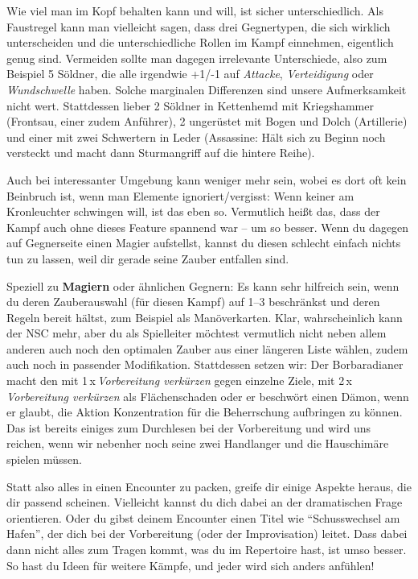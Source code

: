 Wie viel man im Kopf behalten kann und will, ist sicher unterschiedlich.
Als Faustregel kann man vielleicht sagen, dass drei Gegnertypen, die sich wirklich unterscheiden und die unterschiedliche Rollen im Kampf einnehmen, eigentlich genug sind.
Vermeiden sollte man dagegen irrelevante Unterschiede, also zum Beispiel 5 Söldner, die alle irgendwie +1/-1 auf \textit{Attacke}, \textit{Verteidigung} oder \textit{Wundschwelle} haben.
 Solche marginalen Differenzen sind unsere Aufmerksamkeit nicht wert. Stattdessen lieber 2 Söldner in Kettenhemd mit Kriegshammer (Frontsau, einer zudem Anführer), 2 ungerüstet mit Bogen und Dolch (Artillerie) und einer mit zwei Schwertern in Leder (Assassine: Hält sich zu Beginn noch versteckt und macht dann Sturmangriff auf die hintere Reihe).
 
 \neueseite
 
  Auch bei interessanter Umgebung kann weniger mehr sein, wobei es dort oft kein Beinbruch ist, wenn man Elemente ignoriert/vergisst:
  Wenn keiner am Kronleuchter schwingen will, ist das eben so.
  Vermutlich heißt das, dass der Kampf auch ohne dieses Feature spannend war -- um so besser.
  Wenn du dagegen auf Gegnerseite einen Magier aufstellst, kannst du diesen schlecht einfach nichts tun zu lassen, weil dir gerade seine Zauber entfallen sind.

\bigskip

Speziell zu \textbf{Magiern} oder ähnlichen Gegnern:
Es kann sehr hilfreich sein, wenn du deren Zauberauswahl (für diesen Kampf) auf 1--3 beschränkst und deren Regeln bereit hältst, zum Beispiel als Manöverkarten.
Klar, wahrscheinlich kann der NSC mehr, aber du als Spielleiter möchtest vermutlich nicht neben allem anderen auch noch den optimalen Zauber aus einer längeren Liste wählen, zudem auch noch in passender Modifikation.
Stattdessen setzen wir: Der Borbaradianer macht den  mit 1\,x\,\textit{Vorbereitung verkürzen} gegen einzelne Ziele,  mit 2\,x\,\textit{Vorbereitung verkürzen}  als Flächenschaden oder er beschwört einen Dämon, wenn er glaubt, die Aktion Konzentration für die Beherrschung aufbringen zu können.
Das ist bereits einiges zum Durchlesen bei der Vorbereitung und wird uns reichen, wenn wir nebenher noch seine zwei Handlanger und die Hauschimäre spielen müssen. 

\bigskip

Statt also alles in einen Encounter zu packen, greife dir einige Aspekte heraus, die dir passend scheinen. Vielleicht kannst du dich dabei an der dramatischen Frage orientieren.
Oder du gibst deinem Encounter einen Titel wie \enquote{Schusswechsel am Hafen}, der dich bei der Vorbereitung (oder der Improvisation) leitet.
Dass dabei dann nicht alles zum Tragen kommt, was du im Repertoire hast, ist umso besser.
So hast du Ideen für weitere Kämpfe, und jeder wird sich anders anfühlen!

